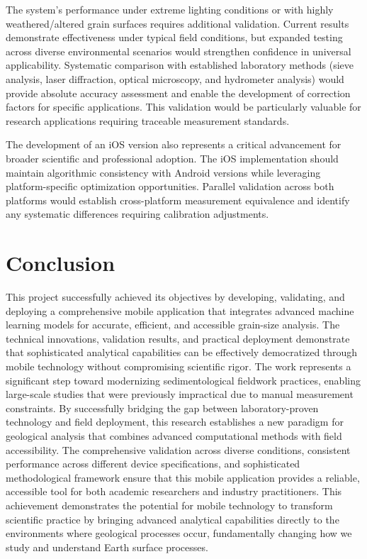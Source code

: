 \documentclass[final-report]{report-template}
\begin{document}
The system's performance under extreme lighting conditions or with highly weathered/altered grain surfaces requires additional validation. Current results demonstrate effectiveness under typical field conditions, but expanded testing across diverse environmental scenarios would strengthen confidence in universal applicability. Systematic comparison with established laboratory methods (sieve analysis, laser diffraction, optical microscopy, and hydrometer analysis) would provide absolute accuracy assessment and enable the development of correction factors for specific applications. This validation would be particularly valuable for research applications requiring traceable measurement standards.

The development of an iOS version also represents a critical advancement for broader scientific and professional adoption. The iOS implementation should maintain algorithmic consistency with Android versions while leveraging platform-specific optimization opportunities. Parallel validation across both platforms would establish cross-platform measurement equivalence and identify any systematic differences requiring calibration adjustments.

\section{Conclusion}
This project successfully achieved its objectives by developing, validating, and deploying a comprehensive mobile application that integrates advanced machine learning models for accurate, efficient, and accessible grain-size analysis. The technical innovations, validation results, and practical deployment demonstrate that sophisticated analytical capabilities can be effectively democratized through mobile technology without compromising scientific rigor. The work represents a significant step toward modernizing sedimentological fieldwork practices, enabling large-scale studies that were previously impractical due to manual measurement constraints. By successfully bridging the gap between laboratory-proven technology and field deployment, this research establishes a new paradigm for geological analysis that combines advanced computational methods with field accessibility. The comprehensive validation across diverse conditions, consistent performance across different device specifications, and sophisticated methodological framework ensure that this mobile application provides a reliable, accessible tool for both academic researchers and industry practitioners. This achievement demonstrates the potential for mobile technology to transform scientific practice by bringing advanced analytical capabilities directly to the environments where geological processes occur, fundamentally changing how we study and understand Earth surface processes.
\end{document}
